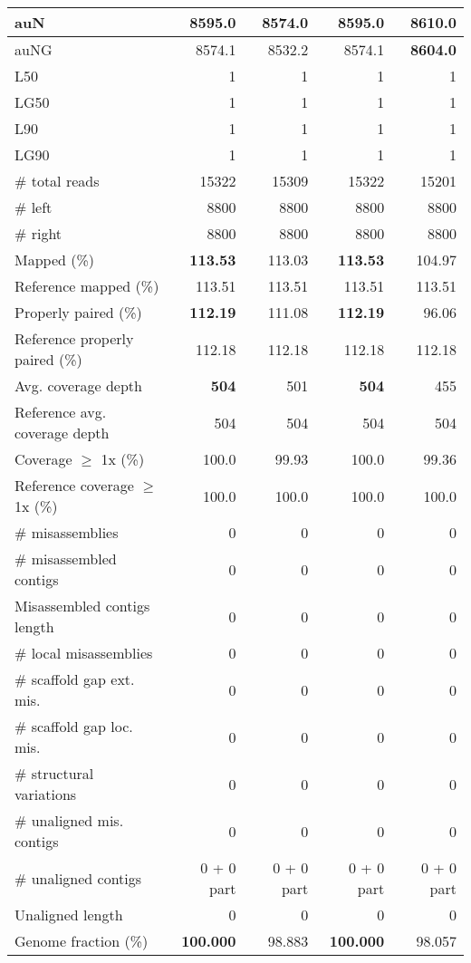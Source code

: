\documentclass[12pt,a4paper]{article}
\begin{document}
\begin{table}[ht]
\begin{center}
\begin{tabular}{|l*{4}{|r}|}
auN & 8595.0 & 8574.0 & 8595.0 & {\bf 8610.0} \\ \hline
auNG & 8574.1 & 8532.2 & 8574.1 & {\bf 8604.0} \\ \hline
L50 & 1 & 1 & 1 & 1 \\ \hline
LG50 & 1 & 1 & 1 & 1 \\ \hline
L90 & 1 & 1 & 1 & 1 \\ \hline
LG90 & 1 & 1 & 1 & 1 \\ \hline
\# total reads & 15322 & 15309 & 15322 & 15201 \\ \hline
\# left & 8800 & 8800 & 8800 & 8800 \\ \hline
\# right & 8800 & 8800 & 8800 & 8800 \\ \hline
Mapped (\%) & {\bf 113.53} & 113.03 & {\bf 113.53} & 104.97 \\ \hline
Reference mapped (\%) & 113.51 & 113.51 & 113.51 & 113.51 \\ \hline
Properly paired (\%) & {\bf 112.19} & 111.08 & {\bf 112.19} & 96.06 \\ \hline
Reference properly paired (\%) & 112.18 & 112.18 & 112.18 & 112.18 \\ \hline
Avg. coverage depth & {\bf 504} & 501 & {\bf 504} & 455 \\ \hline
Reference avg. coverage depth & 504 & 504 & 504 & 504 \\ \hline
Coverage $\geq$ 1x (\%) & 100.0 & 99.93 & 100.0 & 99.36 \\ \hline
Reference coverage $\geq$ 1x (\%) & 100.0 & 100.0 & 100.0 & 100.0 \\ \hline
\# misassemblies & 0 & 0 & 0 & 0 \\ \hline
\# misassembled contigs & 0 & 0 & 0 & 0 \\ \hline
Misassembled contigs length & 0 & 0 & 0 & 0 \\ \hline
\# local misassemblies & 0 & 0 & 0 & 0 \\ \hline
\# scaffold gap ext. mis. & 0 & 0 & 0 & 0 \\ \hline
\# scaffold gap loc. mis. & 0 & 0 & 0 & 0 \\ \hline
\# structural variations & 0 & 0 & 0 & 0 \\ \hline
\# unaligned mis. contigs & 0 & 0 & 0 & 0 \\ \hline
\# unaligned contigs & 0 + 0 part & 0 + 0 part & 0 + 0 part & 0 + 0 part \\ \hline
Unaligned length & 0 & 0 & 0 & 0 \\ \hline
Genome fraction (\%) & {\bf 100.000} & 98.883 & {\bf 100.000} & 98.057 \\ \hline

\end{tabular}
\end{center}
\end{table}
\end{document}
